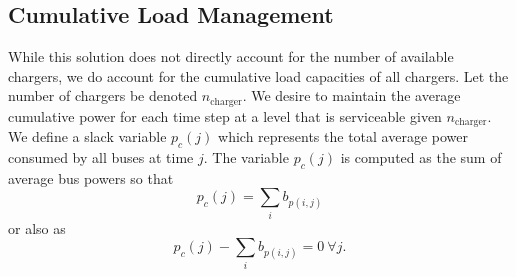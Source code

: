 \subsection{Cumulative Load Management}
\par While this solution does not directly account for the number of available chargers, we do account for the cumulative load capacities of all chargers.  Let the number of chargers be denoted $n_{\text{charger}}$. We desire to maintain the average cumulative power for each time step at a level that is serviceable given $n_{\text{charger}}$. We define a slack variable $p_c(j)$ which represents the total average power consumed by all buses at time $j$.  The variable $p_c(j)$ is computed as the sum of average bus powers so that
\begin{equation*}
	p_c(j) = \sum_ib_{p(i,j)}
\end{equation*}
or also as 
\begin{equation}\label{eqn:battery:busPower}
p_c(j) - \sum_ib_{p(i,j)}  = 0\ \forall j.
\end{equation}

